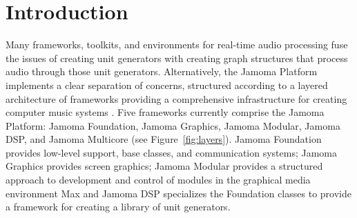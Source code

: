 \documentclass[twoside,a4paper]{article}
\title{\papertitle}
\begin{document}

\maketitle




\begin{abstract}

Jamoma Multicore is a framework for creating graph structures in which unit generators are connected together to process multichannel audio in real-time.  The main applications currently are processing of multichannel audio signals in Max/MSP and live audio coding in Ruby.  Jamoma Multicore forms part of the Jamoma layered architecture.


\end{abstract}




\section{Introduction} %
\label{sec:intro}

Many frameworks, toolkits, and environments for real-time audio processing fuse the issues of creating unit generators with creating graph structures that process audio through those unit generators.  Alternatively, the Jamoma Platform implements a clear separation of concerns, structured according to a layered architecture of frameworks providing a comprehensive infrastructure for creating computer music systems \cite{Place:2010}. Five frameworks currently comprise the Jamoma Platform: Jamoma Foundation, Jamoma Graphics, Jamoma Modular, Jamoma DSP, and Jamoma Multicore (see Figure~\ref{fig:layers}). Jamoma Foundation provides low-level support, base classes, and communication systems; Jamoma Graphics provides screen graphics; Jamoma Modular provides a structured approach to development and control of modules in the graphical media environment Max \cite{Place:2006} and Jamoma DSP specializes the Foundation classes to provide a framework for creating a library of unit generators. 
\end{document}
